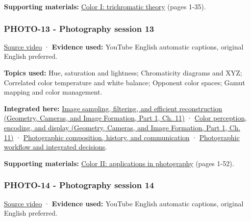 \textbf{Supporting materials:} \href{https://drive.google.com/open?id=0B6w2XfPHEcZYekpvMVN6MkdlZ0U}{Color I: trichromatic theory} (pages 1-35).

\subsubsection{PHOTO-13 - Photography session 13}\label{04-visual-computing-ii-ch036-photo-13---photography-session-13}

\hypertarget{04-visual-computing-ii-ch036-photo-13---photography-session-13}{}

\href{https://www.youtube.com/watch?v=6T_4mVZcozs}{Source video} · \textbf{Evidence used:} YouTube English automatic captions, original English preferred.

\textbf{Topics used:} Hue, saturation and lightness; Chromaticity diagrams and XYZ; Correlated color temperature and white balance; Opponent color spaces; Gamut mapping and color management.

\textbf{Integrated here:} \href{../03-Geometry-Cameras-and-Image-Formation-P01/main.pdf\#nameddest=03-visual-computing-i-ch004-image-sampling-filtering-and-efficient-reconstruction}{Image sampling, filtering, and efficient reconstruction (Geometry, Cameras, and Image Formation, Part 1, Ch. 11)} · \href{../03-Geometry-Cameras-and-Image-Formation-P01/main.pdf\#nameddest=03-visual-computing-i-ch004-color-perception-encoding-and-display}{Color perception, encoding, and display (Geometry, Cameras, and Image Formation, Part 1, Ch. 11)} · \hyperref[04-visual-computing-ii-ch034-photographic-composition-history-and-communication]{Photographic composition, history, and communication} · \hyperref[04-visual-computing-ii-ch034-photographic-workflow-and-integrated-decisions]{Photographic workflow and integrated decisions}.

\textbf{Supporting materials:} \href{https://drive.google.com/open?id=0B6w2XfPHEcZYWllrZHZzRHlZWlk}{Color II: applications in photography} (pages 1-52).

\subsubsection{PHOTO-14 - Photography session 14}\label{04-visual-computing-ii-ch036-photo-14---photography-session-14}

\hypertarget{04-visual-computing-ii-ch036-photo-14---photography-session-14}{}

\href{https://www.youtube.com/watch?v=p964fzQC11g}{Source video} · \textbf{Evidence used:} YouTube English automatic captions, original English preferred.

